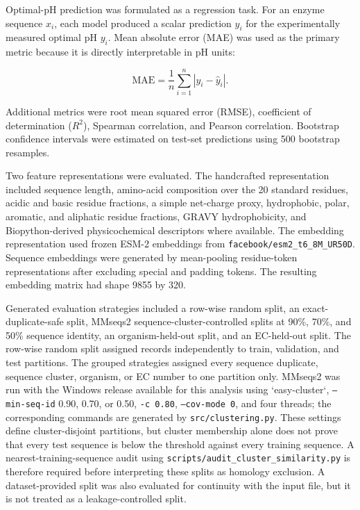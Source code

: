 Optimal-pH prediction was formulated as a regression task. For an enzyme sequence \(x_i\), each model produced a scalar prediction \(\hat{y}_i\) for the experimentally measured optimal pH \(y_i\). Mean absolute error (MAE) was used as the primary metric because it is directly interpretable in pH units:

\begin{equation}
    \mathrm{MAE} = \frac{1}{n}\sum_{i=1}^{n} |y_i - \hat{y}_i|.
    \label{eq:mae}
\end{equation}

Additional metrics were root mean squared error (RMSE), coefficient of determination (\(R^2\)), Spearman correlation, and Pearson correlation. Bootstrap confidence intervals were estimated on test-set predictions using 500 bootstrap resamples.

Two feature representations were evaluated. The handcrafted representation included sequence length, amino-acid composition over the 20 standard residues, acidic and basic residue fractions, a simple net-charge proxy, hydrophobic, polar, aromatic, and aliphatic residue fractions, GRAVY hydrophobicity, and Biopython-derived physicochemical descriptors where available. The embedding representation used frozen ESM-2 embeddings from \texttt{facebook/esm2\_t6\_8M\_UR50D}. Sequence embeddings were generated by mean-pooling residue-token representations after excluding special and padding tokens. The resulting embedding matrix had shape 9855 by 320.

Generated evaluation strategies included a row-wise random split, an exact-duplicate-safe split, MMseqs2 sequence-cluster-controlled splits at 90\%, 70\%, and 50\% sequence identity, an organism-held-out split, and an EC-held-out split. The row-wise random split assigned records independently to train, validation, and test partitions. The grouped strategies assigned every sequence duplicate, sequence cluster, organism, or EC number to one partition only. MMseqs2 was run with the Windows release available for this analysis using `easy-cluster`, \texttt{--min-seq-id} 0.90, 0.70, or 0.50, \texttt{-c 0.80}, \texttt{--cov-mode 0}, and four threads; the corresponding commands are generated by \texttt{src/clustering.py}. These settings define cluster-disjoint partitions, but cluster membership alone does not prove that every test sequence is below the threshold against every training sequence. A nearest-training-sequence audit using \texttt{scripts/audit\_cluster\_similarity.py} is therefore required before interpreting these splits as homology exclusion. A dataset-provided split was also evaluated for continuity with the input file, but it is not treated as a leakage-controlled split.

